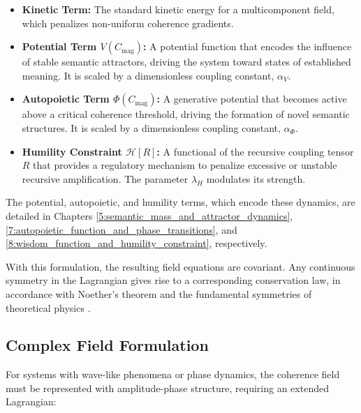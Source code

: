 \begin{itemize}

    \item \textbf{Kinetic Term:} The standard kinetic energy for a multicomponent field, which penalizes non-uniform coherence gradients.

    \item \textbf{Potential Term \(V(C_{\text{mag}})\):} A potential function that encodes the influence of stable semantic attractors, driving the system toward states of established meaning. It is scaled by a dimensionless coupling constant, \(\alpha_V\).

    \item \textbf{Autopoietic Term \(\Phi(C_{\text{mag}})\):} A generative potential that becomes active above a critical coherence threshold, driving the formation of novel semantic structures. It is scaled by a dimensionless coupling constant, \(\alpha_\Phi\).

    \item \textbf{Humility Constraint \(\mathcal{H}[R]\):} A functional of the recursive coupling tensor \(R\) that provides a regulatory mechanism to penalize excessive or unstable recursive amplification. The parameter \(\lambda_H\) modulates its strength.

\end{itemize}

The potential, autopoietic, and humility terms, which encode these dynamics, are detailed in Chapters \ref{5:semantic_mass_and_attractor_dynamics}, \ref{7:autopoietic_function_and_phase_transitions}, and \ref{8:wisdom_function_and_humility_constraint}, respectively.

With this formulation, the resulting field equations are covariant. Any continuous symmetry in the Lagrangian gives rise to a corresponding conservation law, in accordance with Noether's theorem and the fundamental symmetries of theoretical physics \autocite{Noether1918, Lagrange1788, Euler1744, LandauLifshitz1975, PeskinSchroeder1995, Weinberg1995}.


\subsection{Complex Field Formulation}
\label{6.2.1:complex_field_formulation}

For systems with wave-like phenomena or phase dynamics, the coherence field must be represented with amplitude-phase structure, requiring an extended Lagrangian:

